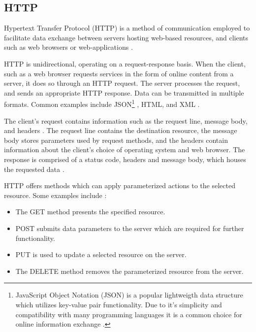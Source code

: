 \documentclass{thesis-ekf}
\theoremstyle{definition}
\theoremstyle{remark}
\begin{document}
{\subsection{HTTP} \label{sub-http}
Hypertext Transfer Protocol (HTTP) is a method of communication employed to facilitate data exchange between servers hosting web-based resources, and clients such as web browsers or web-applications \cite{mdn-http}.

HTTP is unidirectional, operating on a request-response basis. When the client, such as a web browser requests services in the form of online content from a server, it does so through an HTTP request. The server processes the request, and sends an appropriate HTTP response. Data can be transmitted in multiple formats. Common examples include JSON\footnote{JavaScript Object Notation (JSON) is a popular lightweigth data structure which utilizes key-value pair functionality. Due to it's simplicity and compatibility with many programming languages it is a common choice for online information exchange \cite{mdn-json}.}
, HTML, and XML \cite{wiki-http}.

The client's request contains information such as the request line, message body, and headers \cite{req-head}. The request line contains the destination resource, the message body stores parameters used by request methods, and the headers contain information about the client's choice of operating system and web browser. The response is comprised of a status code, headers and message body, which houses the requested data \cite{wiki-http}.

HTTP offers methods which can apply parameterized actions to the selected resource. Some examples include \cite{wiki-http}:
\begin{itemize}
	\item The GET method presents the specified resource. 
	\item POST submits data parameters to the server which are required for further functionality.
	\item PUT is used to update a selected resource on the server.
	\item The DELETE method removes the parameterized resource from the server.
\end{itemize}

}
\end{document}
